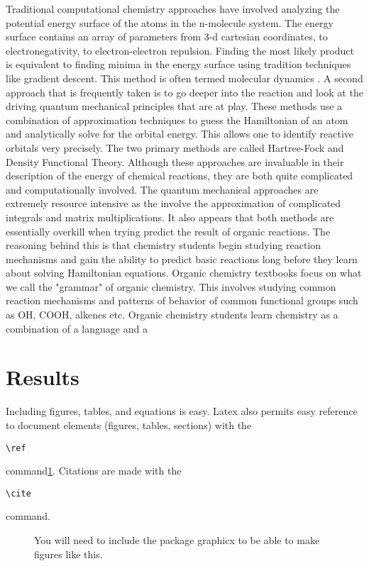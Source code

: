 \documentclass[aps,floatfix,prd,showpacs]{revtex4}
\begin{document}
Traditional computational chemistry approaches have involved analyzing the potential energy surface of the atoms in the n-molecule system. The energy surface contains an array of parameters from 3-d cartesian coordinates, to electronegativity, to electron-electron repulsion. Finding the most likely product is equivalent to finding minima in the energy surface using tradition techniques like gradient descent. This method is often termed molecular dynamics . 
A second approach that is frequently taken is to go deeper into the reaction and look at the driving quantum mechanical principles that are at play. These methods use a combination of approximation techniques to guess the Hamiltonian of an atom and analytically solve for the orbital energy. This allows one to identify reactive orbitals very precisely. The two primary methods are called Hartree-Fock and Density Functional Theory. 
Although these approaches are invaluable in their description of the energy of chemical reactions, they are both quite complicated and computationally involved. The quantum mechanical approaches are extremely resource intensive as the involve the approximation of complicated integrals and matrix multiplications. It also appears that both methods are essentially overkill when trying predict the result of organic reactions. The reasoning behind this is that chemistry students begin studying reaction mechanisms and gain the ability to predict basic reactions long before they learn about solving Hamiltonian equations. Organic chemistry textbooks focus on what we call the "grammar" of organic chemistry. This involves  studying common reaction mechanisms and patterns of behavior of common functional groups such as OH, COOH, alkenes etc. Organic chemistry students learn chemistry as a combination of a language and a 

\section{Results}
Including figures, tables, and equations is easy. Latex also permits easy reference to document elements (figures, tables, sections) with the \begin{verbatim}\ref\end{verbatim} command\ref{fig1}. Citations are made with the \begin{verbatim}\cite\end{verbatim} command\cite{lamport}. 

\begin{figure}[ht]
\caption{You will need to include the package graphicx to be able to make figures like this.}
\label{fig1}
\end{figure}
\end{document}
